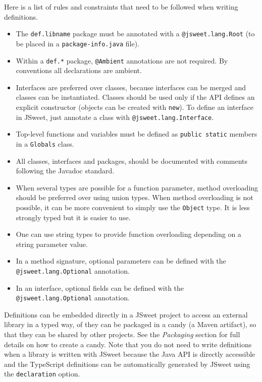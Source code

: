\documentclass[a4paper]{report}
\begin{document}
Here is a list of rules and constraints that need to be followed when writing definitions.

\begin{itemize}
\item The \texttt{def.libname} package must be annotated with a \texttt{@jsweet.lang.Root} (to be placed in a \texttt{package-info.java} file).
\item Within a \texttt{def.*} package, \texttt{@Ambient} annotations are not required. By conventions all declarations are ambient.
\item Interfaces are preferred over classes, because interfaces can be merged and classes can be instantiated. Classes should be used only if the API defines an explicit constructor (objects can be created with \texttt{new}). To define an interface in JSweet, just annotate a class with \texttt{@jsweet.lang.Interface}.
\item Top-level functions and variables must be defined as \texttt{public static} members in a \texttt{Globals} class. 
\item All classes, interfaces and packages, should be documented with comments following the Javadoc standard.
\item When several types are possible for a function parameter, method overloading should be preferred over using union types. When method overloading is not possible, it can be more convenient to simply use the \texttt{Object} type. It is less strongly typed but it is easier to use.
\item One can use string types to provide function overloading depending on a string parameter value.
\item In a method signature, optional parameters can be defined with the \texttt{@jsweet.lang.Optional} annotation. 
\item In an interface, optional fields can be defined with the \texttt{@jsweet.lang.Optional} annotation.
\end{itemize}

Definitions can be embedded directly in a JSweet project to access an external library in a typed way, of they can be packaged in a candy (a Maven artifact), so that they can be shared by other projects.  See the \emph{Packaging} section for full details on how to create a candy. Note that you do not need to write definitions when a library is written with JSweet because the Java API is directly accessible and the TypeScript definitions can be automatically generated by JSweet using the \texttt{declaration} option.
\end{document}
